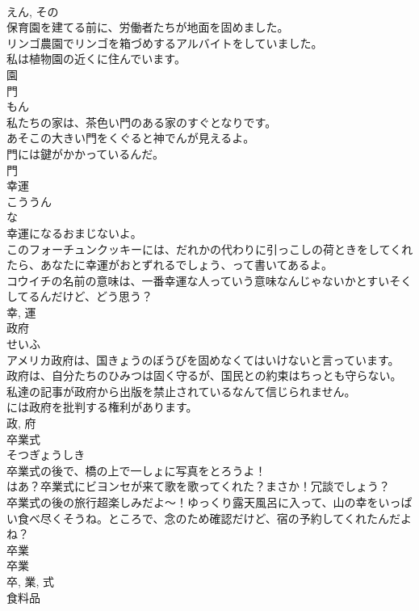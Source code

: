 \documentclass[8pt]{extreport}
\begin{document}
\begin{CJK}{UTF8}{min}
\\	えん, その	
\\	保育園を建てる前に、労働者たちが地面を固めました。	
\\	リンゴ農園でリンゴを箱づめするアルバイトをしていました。	
\\	私は植物園の近くに住んでいます。	
\\	園	
\\	門	
\\	もん	
\\	私たちの家は、茶色い門のある家のすぐとなりです。	
\\	あそこの大きい門をくぐると神でんが見えるよ。	
\\	門には鍵がかかっているんだ。	
\\	門	
\\	幸運	
\\	こううん	
\\	な 
\\	幸運になるおまじないよ。	
\\	このフォーチュンクッキーには、だれかの代わりに引っこしの荷ときをしてくれたら、あなたに幸運がおとずれるでしょう、って書いてあるよ。	
\\	コウイチの名前の意味は、一番幸運な人っていう意味なんじゃないかとすいそくしてるんだけど、どう思う？	
\\	幸, 運	
\\	政府	
\\	せいふ	
\\	アメリカ政府は、国きょうのぼうびを固めなくてはいけないと言っています。	
\\	政府は、自分たちのひみつは固く守るが、国民との約束はちっとも守らない。	
\\	私達の記事が政府から出版を禁止されているなんて信じられません。
\\	には政府を批判する権利があります。	
\\	政, 府	
\\	卒業式	
\\	そつぎょうしき	
\\	卒業式の後で、橋の上で一しょに写真をとろうよ！	
\\	はあ？卒業式にビヨンセが来て歌を歌ってくれた？まさか！冗談でしょう？	
\\	卒業式の後の旅行超楽しみだよ〜！ゆっくり露天風呂に入って、山の幸をいっぱい食べ尽くそうね。ところで、念のため確認だけど、宿の予約してくれたんだよね？	
\\	卒業 
\\	卒業 
\\	卒, 業, 式	
\\	食料品	

\end{CJK}
\end{document}
